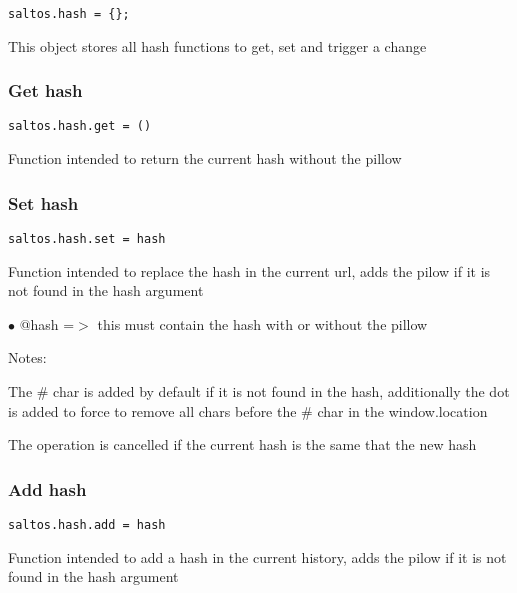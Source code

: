 \documentclass[a4paper]{article}
\begin{document}
\begin{lstlisting}
saltos.hash = {};
\end{lstlisting}

This object stores all hash functions to get, set and trigger a change

\hypertarget{toc809}{}
\subsubsection{Get hash}

\begin{lstlisting}
saltos.hash.get = ()
\end{lstlisting}

Function intended to return the current hash without the pillow

\hypertarget{toc810}{}
\subsubsection{Set hash}

\begin{lstlisting}
saltos.hash.set = hash
\end{lstlisting}

Function intended to replace the hash in the current url, adds the pilow if it is not found
in the hash argument

\begin{compactitem}
\item[\color{myblue}$\bullet$] @hash =$>$ this must contain the hash with or without the pillow
\end{compactitem}

Notes:

The \# char is added by default if it is not found in the hash, additionally the dot is
added to force to remove all chars before the \# char in the window.location

The operation is cancelled if the current hash is the same that the new hash

\hypertarget{toc811}{}
\subsubsection{Add hash}

\begin{lstlisting}
saltos.hash.add = hash
\end{lstlisting}

Function intended to add a hash in the current history, adds the pilow if it is not found
in the hash argument
\end{document}

